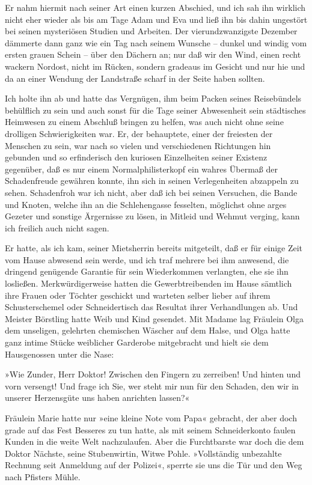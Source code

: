 Er nahm hiermit nach seiner Art einen kurzen Abschied, und ich sah
ihn wirklich nicht eher wieder als bis am Tage Adam und Eva und
ließ ihn bis dahin ungestört bei seinen mysteriösen Studien und
Arbeiten. Der vierundzwanzigste Dezember dämmerte dann ganz wie ein
Tag nach seinem Wunsche – dunkel und windig vom ersten grauen
Schein – über den Dächern an; nur daß wir den Wind, einen recht
wackern Nordost, nicht im Rücken, sondern gradeaus im Gesicht und
nur hie und da an einer Wendung der Landstraße scharf in der Seite
haben sollten.

Ich holte ihn ab und hatte das Vergnügen, ihm beim Packen seines
Reisebündels behülflich zu sein und auch sonst für die Tage seiner
Abwesenheit sein städtisches Heimwesen zu einem Abschluß bringen zu
helfen, was auch nicht ohne seine drolligen Schwierigkeiten war.
Er, der behauptete, einer der freiesten der Menschen zu sein, war
nach so vielen und verschiedenen Richtungen hin gebunden und so
erfinderisch den kuriosen Einzelheiten seiner Existenz gegenüber,
daß es nur einem Normalphilisterkopf ein wahres Übermaß der
Schadenfreude gewähren konnte, ihn sich in seinen Verlegenheiten
abzappeln zu sehen. Schadenfroh war ich nicht, aber daß ich bei
seinen Versuchen, die Bande und Knoten, welche ihn an die
Schlehengasse fesselten, möglichst ohne arges Gezeter und sonstige
Ärgernisse zu lösen, in Mitleid und Wehmut verging, kann ich
freilich auch nicht sagen.

Er hatte, als ich kam, seiner Mietsherrin bereits mitgeteilt, daß
er für einige Zeit vom Hause abwesend sein werde, und ich traf
mehrere bei ihm anwesend, die dringend genügende Garantie für sein
Wiederkommen verlangten, ehe sie ihn losließen. Merkwürdigerweise
hatten die Gewerbtreibenden im Hause sämtlich ihre Frauen oder
Töchter geschickt und warteten selber lieber auf ihrem
Schusterschemel oder Schneidertisch das Resultat ihrer
Verhandlungen ab. Und Meister Börstling hatte Weib und Kind
gesendet. Mit Madame lag Fräulein Olga dem unseligen, gelehrten
chemischen Wäscher auf dem Halse, und Olga hatte ganz intime Stücke
weiblicher Garderobe mitgebracht und hielt sie dem Hausgenossen
unter die Nase:

»Wie Zunder, Herr Doktor! Zwischen den Fingern zu zerreiben! Und
hinten und vorn versengt! Und frage ich Sie, wer steht mir nun für
den Schaden, den wir in unserer Herzensgüte uns haben anrichten
lassen?«

Fräulein Marie hatte nur »eine kleine Note vom Papa« gebracht, der
aber doch grade auf das Fest Besseres zu tun hatte, als mit seinem
Schneiderkonto faulen Kunden in die weite Welt nachzulaufen. Aber
die Furchtbarste war doch die dem Doktor Nächste, seine
Stubenwirtin, Witwe Pohle. »Vollständig unbezahlte Rechnung seit
Anmeldung auf der Polizei«, sperrte sie uns die Tür und den Weg
nach Pfisters Mühle.

